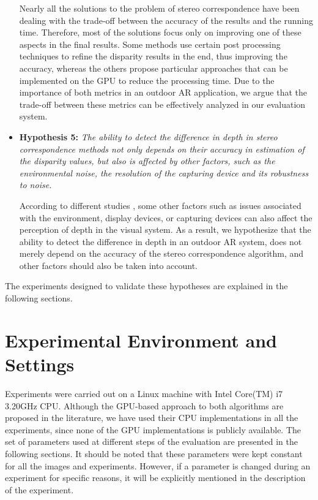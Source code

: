 \begin{itemize}
Nearly all the solutions to the problem of stereo correspondence have been dealing with the trade-off between the accuracy of the results and the running time.
Therefore, most of the solutions focus only on improving one of these aspects in the final results. Some methods use certain post processing techniques to refine the 
disparity results in the end, thus improving the accuracy, whereas the others propose particular approaches that can be implemented on the GPU to reduce the processing time.
Due to the importance of both metrics in an outdoor AR application, we argue that the trade-off between these metrics can be effectively analyzed in our evaluation system.

\item \textbf{Hypothesis 5:} \emph{The ability to detect the difference in depth in stereo correspondence methods not only depends on their accuracy
in estimation of the disparity values, but also is affected by other factors, such as the environmental noise, the resolution of the capturing device and its
robustness to noise.}

According to different studies \cite{dras96, kru10,azuma01}, some other factors such as issues associated with the environment, display devices, or capturing devices
can also affect the perception of depth in the visual system. As a result, we hypothesize that the ability to detect the difference in depth in an outdoor AR system,
does not merely depend on the accuracy of the stereo correspondence algorithm, and other factors should also be taken into account.
\end{itemize}
\noindent
The experiments designed to validate these hypotheses are explained in the following sections.

\section{Experimental Environment and Settings}
Experiments were carried out on a Linux machine with Intel Core(TM) i7 3.20GHz CPU. 
Although the GPU-based approach to both algorithms are proposed in the literature,
we have used their CPU implementations in all the experiments, since none of the GPU implementations is publicly available.
The set of parameters used at different steps of the evaluation are presented in the following sections.
It should be noted that these parameters were kept constant for all the images and experiments. However, if a parameter is changed during an experiment for specific
reasons, it will be explicitly mentioned in the description of the experiment.

